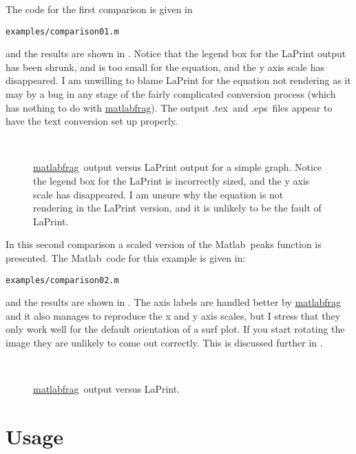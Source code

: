 \documentclass[a4paper,11pt]{article}
\newcommand\matlabfrag{\texorpdfstring{\href{http://www.mathworks.com/matlabcentral/fileexchange/21286}{{\ttfamily matlabfrag}}}{matlabfrag}}
\newcommand\matlab{\texorpdfstring{{\sc Matlab}}{Matlab}}
\newcommand\tex{\texorpdfstring{{\sc .tex}}{.tex}}
\newcommand\eps{\texorpdfstring{{\sc .eps}}{.eps}}
\begin{document}
	The code for the first comparison is given in\par
	{\verb|examples/comparison01.m|}\par\noindent
	and the results are shown in . Notice that the legend box for the LaPrint
	output has been shrunk, and is too small for the equation, and the y axis scale has disappeared.
	I am unwilling to blame {\ttfamily LaPrint} for the equation not rendering as it may by a bug
	in any stage of the fairly complicated conversion process (which has nothing to do with
	\matlabfrag). The output \tex\ and \eps\ files appear to have the text conversion set up
	properly.
	\begin{figure}[ht]
		\centering
		\,
		\caption{\matlabfrag\ output versus {\ttfamily LaPrint} output for a simple graph. Notice the
			legend box for the {\ttfamily LaPrint} is incorrectly sized, and the y axis scale has
			disappeared. I am unsure why the equation is not rendering in the {\ttfamily LaPrint}
			version, and it is unlikely to be the fault of {\ttfamily LaPrint}.}
	\end{figure}
	
	In this second comparison a scaled version of the \matlab\ {\ttfamily peaks} function is
	presented. The \matlab\ code for this example is given in:\par
	{\verb|examples/comparison02.m|}\par\noindent
	and the results are shown in . The axis labels are handled better by
	\matlabfrag\, and it also manages to reproduce the x and y axis scales, but I stress that they
	only work well for the default orientation of a {\ttfamily surf} plot. If you start rotating
	the image they are unlikely to come out correctly. This is discussed further in .
	\begin{figure}[ht]
		\centering
		\,
		\caption{\matlabfrag\ output versus {\ttfamily LaPrint}.}
	\end{figure}
	
	\section{Usage}%
\end{document}
